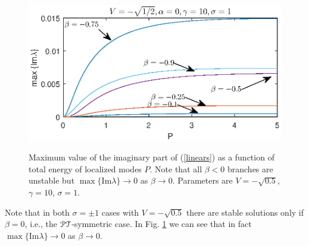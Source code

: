 \documentclass[aps,pre,showpacs,twocolumn]{revtex4}
\newcommand{\PT}{{\cal PT}}
\begin{document}
\begin{figure}[!htb]
\begin{center}
\scalebox{.7} {\includegraphics{stab_P_lambda.eps}}
\end{center}
\caption{Maximum value of the imaginary part of (\ref{linears}) as a function of total energy of localized modes $P$. Note that all 
$\beta<0$ branches are unstable but $\max \{\text{Im}\lambda\}\to 0$ as $\beta\to 0$. Parameters are $V=-\sqrt{0.5}$, $\gamma=10$, 
$\sigma=1$.}
\label{fig:stab_P_lambda}
\end{figure}
Note that in both $\sigma=\pm 1$ cases with $V=-\sqrt{0.5}$ there are stable solutions only if $\beta=0$, i.e., the $\PT$-symmetric case. In Fig. \ref{fig:stab_P_lambda} we can see that in fact $\max \{\text{Im}\lambda\}\to 0$ as $\beta\to 0$.
\end{document}
